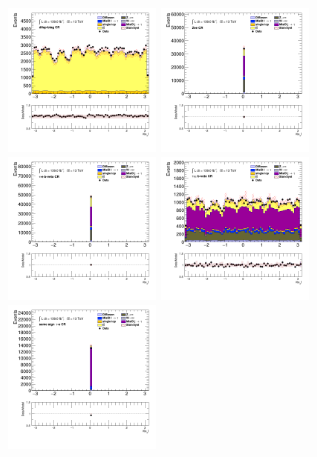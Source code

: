 		\begin{figure}[!htp]
			\begin{center}    
			\includegraphics[width=0.35\textwidth]{chapters/chapter6_HPlus/images/taulep/mu_0_phi_DILEP_BTAG.png}
			\includegraphics[width=0.35\textwidth]{chapters/chapter6_HPlus/images/taulep/mu_0_phi_ZEE.png} \\
			\includegraphics[width=0.35\textwidth]{chapters/chapter6_HPlus/images/taulep/mu_0_phi_TAUEL_BVETO.png} 
			\includegraphics[width=0.35\textwidth]{chapters/chapter6_HPlus/images/taulep/mu_0_phi_TAUMU_BVETO.png} \\
			\includegraphics[width=0.35\textwidth]{chapters/chapter6_HPlus/images/taulep/mu_0_phi_SS_TAUEL.png} 

\end{center}
\end{figure}

